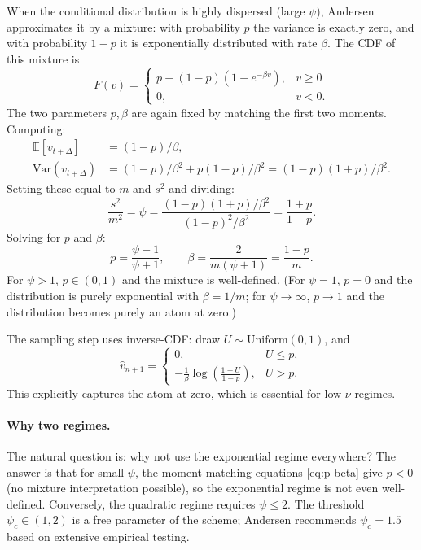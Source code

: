 \documentclass[11pt]{article}
\theoremstyle{plain}
\theoremstyle{definition}
\theoremstyle{remark}
\begin{document}
When the conditional distribution is highly dispersed (large $\psi$), Andersen approximates it by a mixture: with probability $p$ the variance is exactly zero, and with probability $1 - p$ it is exponentially distributed with rate $\beta$. The CDF of this mixture is
\begin{equation}
    F(v) = \begin{cases} p + (1-p)(1 - e^{-\beta v}), & v \geq 0 \\ 0, & v < 0. \end{cases}                     \label{eq:exp-cdf}
\end{equation}
The two parameters $p, \beta$ are again fixed by matching the first two moments. Computing:
\begin{align*}
    \mathbb{E}[v_{t+\Delta}] &= (1-p)/\beta, \\
    \mathrm{Var}(v_{t+\Delta}) &= (1-p)/\beta^2 + p(1-p)/\beta^2 = (1-p)(1+p)/\beta^2.
\end{align*}
Setting these equal to $m$ and $s^2$ and dividing:
\[
    \frac{s^2}{m^2} = \psi = \frac{(1-p)(1+p)/\beta^2}{(1-p)^2/\beta^2} = \frac{1+p}{1-p}.
\]
Solving for $p$ and $\beta$:
\begin{equation}
    p = \frac{\psi - 1}{\psi + 1}, \qquad \beta = \frac{2}{m(\psi + 1)} = \frac{1 - p}{m}.                       \label{eq:p-beta}
\end{equation}
For $\psi > 1$, $p \in (0, 1)$ and the mixture is well-defined. (For $\psi = 1$, $p = 0$ and the distribution is purely exponential with $\beta = 1/m$; for $\psi \to \infty$, $p \to 1$ and the distribution becomes purely an atom at zero.)

The sampling step uses inverse-CDF: draw $U \sim \mathrm{Uniform}(0, 1)$, and
\begin{equation}
    \hat v_{n+1} = \begin{cases} 0, & U \leq p, \\ -\frac{1}{\beta} \log\!\left(\frac{1 - U}{1 - p}\right), & U > p. \end{cases}                                                                                                  \label{eq:exp-sample}
\end{equation}
This explicitly captures the atom at zero, which is essential for low-$\nu$ regimes.

\paragraph{Why two regimes.} The natural question is: why not use the exponential regime everywhere? The answer is that for small $\psi$, the moment-matching equations \eqref{eq:p-beta} give $p < 0$ (no mixture interpretation possible), so the exponential regime is not even well-defined. Conversely, the quadratic regime requires $\psi \leq 2$. The threshold $\psi_c \in (1, 2)$ is a free parameter of the scheme; Andersen recommends $\psi_c = 1.5$ based on extensive empirical testing.
\end{document}
